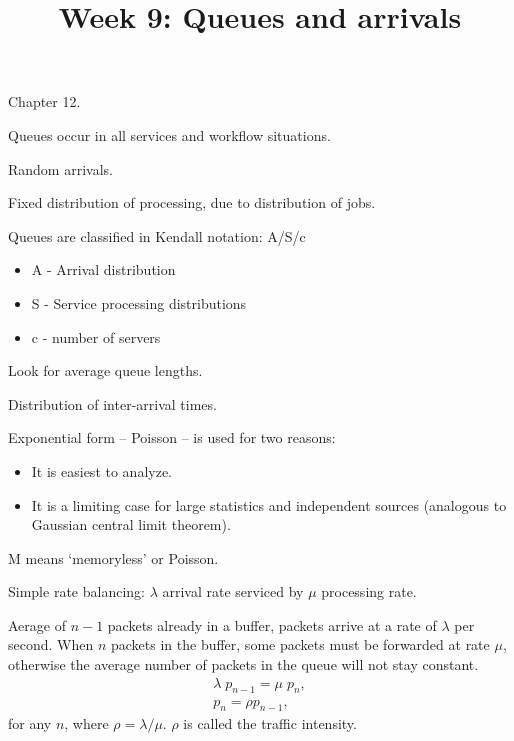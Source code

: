 \documentclass{slides}
\title{Week 9: Queues and arrivals}
\begin{document}
\maketitle




Chapter 12.

Queues occur in all services and workflow situations.

Random arrivals.

Fixed distribution of processing, due to distribution of jobs.

Queues are classified in Kendall notation: A/S/c
\begin{itemize}
\item A - Arrival distribution
\item S - Service processing distributions
\item c - number of servers
\end{itemize}

Look for average queue lengths.


Distribution of inter-arrival times.

Exponential form -- Poisson -- is used for two reasons:

\begin{itemize}
\item It is easiest to analyze.
\item It is a limiting case for large statistics and independent sources (analogous
to Gaussian central limit theorem).
\end{itemize}


M means `memoryless' or Poisson.

Simple rate balancing: $\lambda$ arrival rate serviced by $\mu$ processing rate.

Aerage of $n-1$ packets already in a buffer, packets
arrive at a rate of $\lambda$ per second. When
$n$ packets in the buffer, some packets must be forwarded at rate $\mu$,
otherwise the average number of packets in the queue will not stay constant.
\begin{eqnarray}
\lambda\; p_{n-1} = \mu\; p_{n},\nonumber\\
p_{n} = \rho p_{n-1},\nonumber
\end{eqnarray}
for any $n$, where $\rho=\lambda/\mu$. $\rho$ is called the
traffic intensity. 
\end{document}
